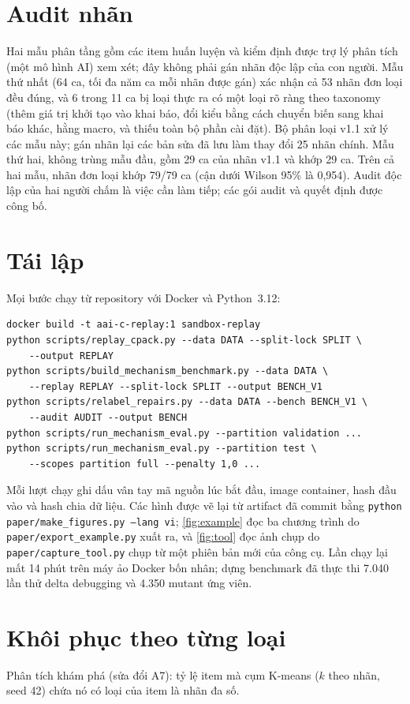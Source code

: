 \documentclass[a4paper,preprint,12pt,authoryear]{elsarticle}
\begin{document}
\section{Audit nhãn}\label{app:audit}
Hai mẫu phân tầng gồm các item huấn luyện và kiểm định được trợ lý phân tích (một mô hình AI) xem xét; đây không phải gán nhãn độc lập của con người. Mẫu thứ nhất (64 ca, tối đa năm ca mỗi nhãn được gán) xác nhận cả 53 nhãn đơn loại đều đúng, và 6 trong 11 ca bị loại thực ra có một loại rõ ràng theo taxonomy (thêm giá trị khởi tạo vào khai báo, đổi kiểu bằng cách chuyển biến sang khai báo khác, hằng macro, và thiếu toàn bộ phần cài đặt). Bộ phân loại v1.1 xử lý các mẫu này; gán nhãn lại các bản sửa đã lưu làm thay đổi 25 nhãn chính. Mẫu thứ hai, không trùng mẫu đầu, gồm 29 ca của nhãn v1.1 và khớp 29 ca. Trên cả hai mẫu, nhãn đơn loại khớp 79/79 ca (cận dưới Wilson 95\% là 0,954). Audit độc lập của hai người chấm là việc cần làm tiếp; các gói audit và quyết định được công bố.

\section{Tái lập}\label{app:repro}
Mọi bước chạy từ repository với Docker và Python~3.12:
\begin{verbatim}
docker build -t aai-c-replay:1 sandbox-replay
python scripts/replay_cpack.py --data DATA --split-lock SPLIT \
    --output REPLAY
python scripts/build_mechanism_benchmark.py --data DATA \
    --replay REPLAY --split-lock SPLIT --output BENCH_V1
python scripts/relabel_repairs.py --data DATA --bench BENCH_V1 \
    --audit AUDIT --output BENCH
python scripts/run_mechanism_eval.py --partition validation ...
python scripts/run_mechanism_eval.py --partition test \
    --scopes partition full --penalty 1,0 ...
\end{verbatim}
Mỗi lượt chạy ghi dấu vân tay mã nguồn lúc bắt đầu, image container, hash đầu vào và hash chia dữ liệu. Các hình được vẽ lại từ artifact đã commit bằng \texttt{python paper/make\_figures.py --lang vi}; \cref{fig:example} đọc ba chương trình do \texttt{paper/export\_example.py} xuất ra, và \cref{fig:tool} đọc ảnh chụp do \texttt{paper/capture\_tool.py} chụp từ một phiên bản mới của công cụ. Lần chạy lại mất 14 phút trên máy ảo Docker bốn nhân; dựng benchmark đã thực thi 7.040 lần thử delta debugging và 4.350 mutant ứng viên.

\section{Khôi phục theo từng loại}\label{app:categories}
Phân tích khám phá (sửa đổi A7): tỷ lệ item mà cụm K-means ($k$ theo nhãn, seed 42) chứa nó có loại của item là nhãn đa số.
\end{document}
